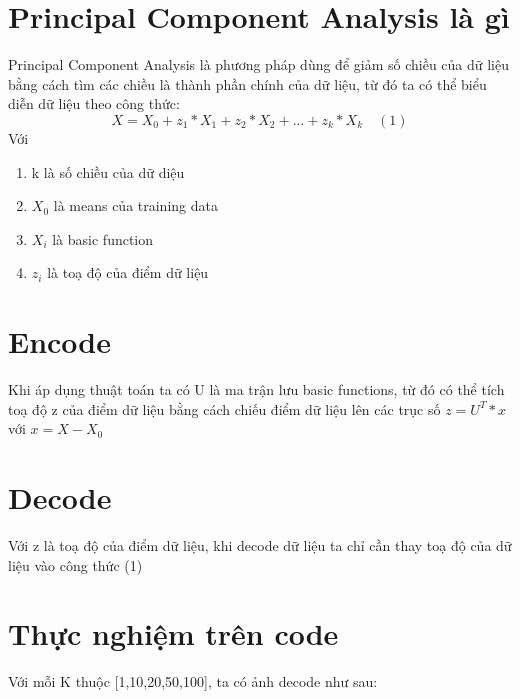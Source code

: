 \documentclass[12pt,letterpaper]{article}
\begin{document}
\section*{Principal Component Analysis là gì}

Principal Component Analysis là phương pháp dùng để giảm số chiều của dữ liệu bằng cách tìm các chiều là thành phần chính của dữ liệu, từ đó ta có thể biểu diễn dữ liệu theo công thức:
$$
    X = X_0 + z_1*X_1 + z_2*X_2 + ... + z_k*X_k    \quad (1)
$$
Với 
\begin{enumerate}
    \item k là số chiều của dữ diệu
    \item $X_0$ là means của training data
    \item $X_i$ là basic function
    \item $z_i$ là toạ độ của điểm dữ liệu
\end{enumerate}

\section*{Encode}
Khi áp dụng thuật toán ta có U là ma trận lưu basic functions, từ đó có thể tích toạ độ z của điểm dữ liệu bằng cách chiếu điểm dữ liệu lên các trục số
$z = U^T * x$ với $x = X - X_0$
\section*{Decode}
Với z là toạ độ của điểm dữ liệu, khi decode dữ liệu ta chỉ cần thay toạ độ của dữ liệu vào công thức (1)
\section*{Thực nghiệm trên code}
Với mỗi K thuộc [1,10,20,50,100], ta có ảnh decode như sau: 
\end{document}

